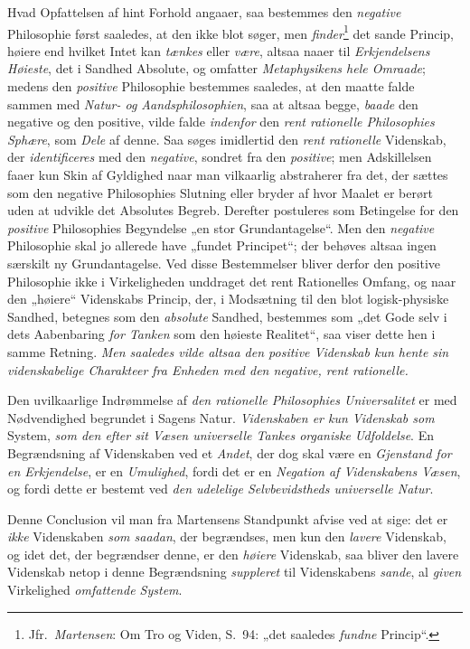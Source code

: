 \documentclass[12pt,a4paper]{book}
\newcommand{\opage}[1]{\marginnote{\footnotesize\textit{[#1]}}}
\begin{document}
Hvad Opfattelsen af hint Forhold angaaer, saa bestemmes den \emph{negative} Philosophie først
saaledes, at den ikke blot søger, men \emph{finder}\footnote{Jfr.\ \emph{Martensen}: Om
Tro og Viden, S.\ 94: „det saaledes \emph{fundne} Princip“.} det sande Princip, høiere end
hvilket Intet kan \emph{tænkes} eller \emph{være}, altsaa naaer til \emph{Erkjendelsens Høieste}, det i Sandhed Absolute, og omfatter \emph{Metaphysikens hele Omraade}; medens den \emph{positive} Philosophie bestemmes saaledes, at den maatte falde sammen med \emph{Natur- og
Aandsphilosophien}, saa at altsaa begge, \emph{baade} den negative og den positive, vilde falde
\emph{indenfor} den \emph{rent rationelle Philosophies Sphære}, som \emph{Dele} af denne. Saa søges
imidlertid den \emph{rent rationelle} Videnskab, der \emph{identificeres} med den \emph{negative}, sondret fra den \emph{positive}; men Adskillelsen faaer kun Skin af Gyldighed naar man
vilkaarlig abstraherer fra det, der sættes som den negative Philosophies Slutning eller
bryder af hvor Maalet er berørt uden \opage{105}at udvikle det Absolutes Begreb. Derefter postuleres
som Betingelse for den \emph{positive} Philosophies Begyndelse „en stor Grundantagelse“. Men den \emph{negative} Philosophie skal jo allerede have „fundet Principet“; der behøves altsaa ingen
særskilt ny Grundantagelse. Ved disse Bestemmelser bliver derfor den positive Philosophie
ikke i Virkeligheden unddraget det rent Rationelles Omfang, og naar den „høiere“
Videnskabs Princip, der, i Modsætning til den blot logisk-physiske Sandhed, betegnes som den \emph{absolute} Sandhed, bestemmes som „det Gode selv i dets Aabenbaring \emph{for Tanken} som den
høieste Realitet“, saa viser dette hen i samme Retning. \emph{Men saaledes vilde altsaa
den positive Videnskab kun hente sin videnskabelige Charakteer fra Enheden med den
negative, rent rationelle.}

Den uvilkaarlige Indrømmelse af \emph{den rationelle Philosophies Universalitet} er med
Nødvendighed begrundet i Sagens Natur. \emph{Videnskaben er kun Videnskab som} System, \emph{som den efter sit Væsen universelle Tankes organiske Udfoldelse}. En Begrændsning af Videnskaben ved et \emph{Andet}, der dog skal være en \emph{Gjenstand for en Erkjendelse}, er en \emph{Umulighed}, fordi det er en \emph{Negation af Videnskabens Væsen}, og fordi dette er bestemt ved \emph{den udelelige Selvbevidstheds universelle Natur}.

Denne Conclusion vil man fra Martensens Standpunkt afvise ved at sige: det er \emph{ikke} Videnskaben \emph{som saadan}, der begrændses, men kun den \emph{lavere} Videnskab, og idet det, der
begrændser denne, er den \emph{høiere} Videnskab, saa bliver den lavere Videnskab netop i denne Begrændsning \emph{suppleret} til Videnskabens \emph{sande}, al \emph{given} Virkelighed \emph{omfattende System}.
\end{document}
